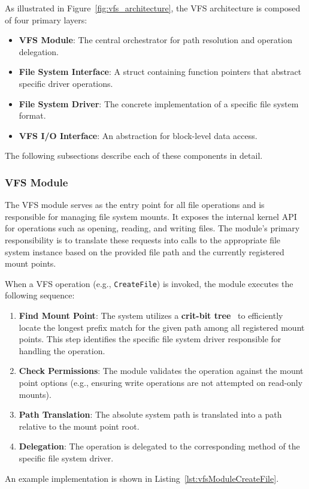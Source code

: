 \documentclass[a4paper,10pt,twoside]{report}
\theoremstyle{definition}
\begin{document}
As illustrated in Figure~\ref{fig:vfs_architecture}, the VFS architecture is composed of four primary layers:

\begin{itemize}
\item \textbf{VFS Module}: The central orchestrator for path resolution and operation delegation.
\item \textbf{File System Interface}: A struct containing function pointers that abstract specific driver operations.
\item \textbf{File System Driver}: The concrete implementation of a specific file system format.
\item \textbf{VFS I/O Interface}: An abstraction for block-level data access.
\end{itemize}

The following subsections describe each of these components in detail.

\subsubsection{VFS Module}

The VFS module serves as the entry point for all file operations and is responsible for managing file system mounts. It exposes the internal kernel API for operations such as opening, reading, and writing files. The module's primary responsibility is to translate these requests into calls to the appropriate file system instance based on the provided file path and the currently registered mount points.

When a VFS operation (e.g., \texttt{CreateFile}) is invoked, the module executes the following sequence:
\begin{enumerate}
    \item \textbf{Find Mount Point}: The system utilizes a \textbf{crit-bit tree}~\cite{critbit} to efficiently locate the longest prefix match for the given path among all registered mount points. This step identifies the specific file system driver responsible for handling the operation.
    \item \textbf{Check Permissions}: The module validates the operation against the mount point options (e.g., ensuring write operations are not attempted on read-only mounts).
    \item \textbf{Path Translation}: The absolute system path is translated into a path relative to the mount point root.
    \item \textbf{Delegation}: The operation is delegated to the corresponding method of the specific file system driver.
\end{enumerate}
An example implementation is shown in Listing~\ref{lst:vfsModuleCreateFile}.
\end{document}
